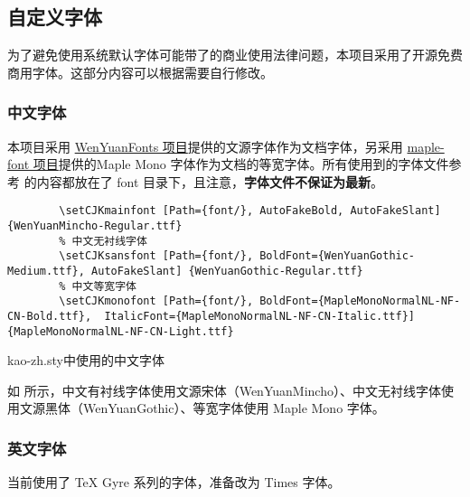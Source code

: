 \subsection{自定义字体}
为了避免使用系统默认字体可能带了的商业使用法律问题，本项目采用了开源免费商用字体。这部分内容可以根据需要自行修改。

\subsubsection{中文字体}

本项目采用 \href{https://github.com/takushun-wu/WenYuanFonts}{WenYuanFonts 项目}提供的文源字体作为文档字体，另采用 \href{https://github.com/subframe7536/maple-font}{maple-font 项目}提供的Maple Mono 字体作为文档的等宽字体。所有使用到的字体文件参考  的内容都放在了 font 目录下，且注意，\textbf{字体文件不保证为最新}。

\begin{listing}[H]
    \begin{verbatim}
        \setCJKmainfont [Path={font/}, AutoFakeBold, AutoFakeSlant] {WenYuanMincho-Regular.ttf}
        % 中文无衬线字体
        \setCJKsansfont [Path={font/}, BoldFont={WenYuanGothic-Medium.ttf}, AutoFakeSlant] {WenYuanGothic-Regular.ttf}
        % 中文等宽字体
        \setCJKmonofont [Path={font/}, BoldFont={MapleMonoNormalNL-NF-CN-Bold.ttf},  ItalicFont={MapleMonoNormalNL-NF-CN-Italic.ttf}] {MapleMonoNormalNL-NF-CN-Light.ttf}
    \end{verbatim}
    \caption{kao-zh.sty中使用的中文字体}
\end{listing}

如  所示，中文有衬线字体使用文源宋体（WenYuanMincho）、中文无衬线字体使用文源黑体（WenYuanGothic）、等宽字体使用 Maple Mono 字体。

\subsubsection{英文字体}

当前使用了 TeX Gyre 系列的字体，准备改为 Times 字体。 

\iffalse
\section{后续内容}
\subsection{富强民主}
\zhlipsum[3]
\fi